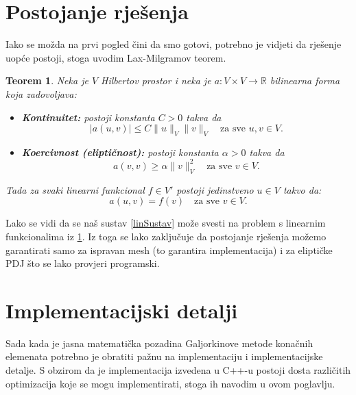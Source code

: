 \documentclass[zavrsnirad]{../fer}
\newtheorem{teorem}{Teorem}
\begin{document}
\section{Postojanje rješenja}
\label{postojanje}
Iako se možda na prvi pogled čini da smo gotovi, potrebno 
je vidjeti da rješenje uopće postoji, stoga uvodim 
Lax-Milgramov teorem.
\begin{teorem}
  \label{laxMil}
Neka je $ V $ Hilbertov prostor i neka je $ a: V \times V \rightarrow \mathbb{R} $ bilinearna forma koja zadovoljava:
\begin{itemize}
    \item \textbf{Kontinuitet:} postoji konstanta $ C > 0 $ takva da
    $$
    |a(u, v)| \leq C \|u\|_V \|v\|_V \quad \text{za sve } u, v \in V.
    $$
    
    \item \textbf{Koercivnost (eliptičnost):} postoji konstanta $ \alpha > 0 $ takva da
    $$
    a(v, v) \geq \alpha \|v\|_V^2 \quad \text{za sve } v \in V.
    $$
\end{itemize}

Tada za svaki linearni funkcional $ f \in V' $ postoji jedinstveno $ u \in V $ takvo da:
$$
a(u, v) = f(v) \quad \text{za sve } v \in V.
$$
\end{teorem}
Lako se vidi da se naš sustav \ref{linSustav} 
može svesti na problem s linearnim funkcionalima iz
\ref{laxMil}. Iz toga se lako zaključuje da
postojanje rješenja možemo garantirati samo za ispravan mesh
(to garantira implementacija) i za eliptičke PDJ što se lako provjeri programski.

\section{Implementacijski detalji}
\label{implementacijaOpis}
Sada kada je jasna matematička pozadina 
Galjorkinove metode konačnih elemenata potrebno je 
obratiti pažnu na implementaciju i implementacijske detalje.
S obzirom da je implementacija izvedena u C++-u postoji
dosta različitih optimizacija koje se mogu implementirati,
stoga ih navodim u ovom poglavlju.
\end{document}
